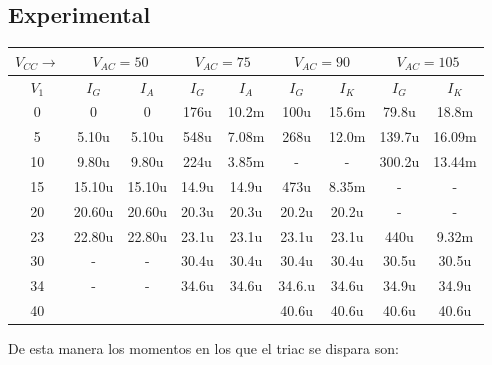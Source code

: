 \subsection{Experimental}
\begin{table}[H]
  \begin{center}
    \begin{tabular}{|c|c|c|c|c|c|c|c|c|}
      \hline
      $V_{CC}\rightarrow $&\multicolumn{2}{|c|}{$V_{AC}=50$} &\multicolumn{2}{c|}{$V_{AC}=75$} &\multicolumn{2}{c|}{$V_{AC}=90$} &\multicolumn{2}{c|}{$V_{AC}=105$}\\ 
      \hline
      \hline
      $V_{1}$ &$I_G$ &$I_A$  &$I_G$ &$I_A$  &$I_G$ &$I_K$  &$I_G$ &$I_K$\\ 
      \hline
      0    &0      &0        &176u    &10.2m   &100u   &15.6m &79.8u    &18.8m    \\
      5    &5.10u  &5.10u    &548u    &7.08m   &268u   &12.0m &139.7u   &16.09m   \\
      10   &9.80u  &9.80u    &224u    &3.85m   &-      &-     &300.2u   &13.44m   \\
      15   &15.10u &15.10u   &14.9u   &14.9u   &473u   &8.35m &-        &-        \\
      20   &20.60u &20.60u   &20.3u   &20.3u   &20.2u  &20.2u &-        &-        \\
      23   &22.80u &22.80u   &23.1u   &23.1u   &23.1u  &23.1u &440u     &9.32m    \\
      30   &-      &-        &30.4u   &30.4u   &30.4u  &30.4u &30.5u    &30.5u    \\
      34   &-      &-        &34.6u   &34.6u   &34.6.u &34.6u &34.9u    &34.9u    \\
      40   &       &         &        &        &40.6u  &40.6u &40.6u    &40.6u    \\
            \hline
    \end{tabular}
  \end{center}
\end{table}
De esta manera los momentos en los que el triac se dispara son:
